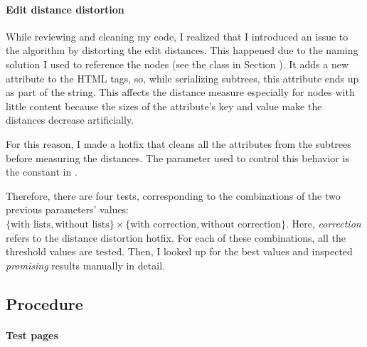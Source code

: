 \documentclass[10pt]{article}
\newcommand{\nodenamer}{\path{NodeNamer}}
\begin{document}

\paragraph{Edit distance distortion}

While reviewing and cleaning my code, I realized that I introduced an issue to the algorithm by distorting the edit distances. This happened due to the naming solution I used to reference the nodes (see the class \nodenamer{} in Section ). It adds a new attribute to the HTML tags, so, while serializing subtrees, this attribute ends up as part of the string. This affects the distance measure especially for nodes with little content because the sizes of the attribute's key and value make the distances decrease artificially. 

For this reason, I made a hotfix that cleans all the attributes from the subtrees before measuring the distances. The parameter used to control this behavior is the constant \footnotemark  in .


Therefore, there are four tests, corresponding to the combinations of the two previous parameters' values: $\{\text{with lists}, \text{without lists}\} \times \{\text{with correction}, \text{without correction}\}$. Here, \emph{correction} refers to the distance distortion hotfix. For each of these combinations, all the threshold values are tested. Then, I looked up for the best values and inspected \emph{promising} results manually in detail.



\subsection{Procedure} \label{txt:procedure}

\paragraph{Test pages}
\end{document}
